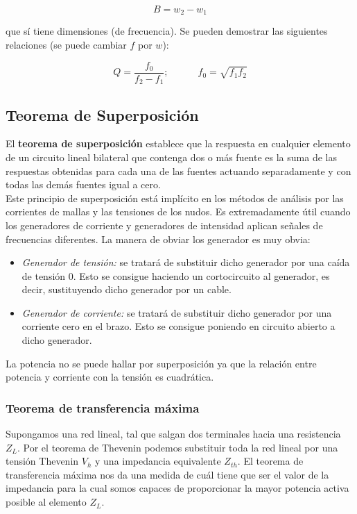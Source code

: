 \documentclass[12pt,a4paper]{article}
\newcommand{\tquad}{\quad \quad \quad}
\begin{document}
\begin{equation}
B = w_2 - w_1
\end{equation}

que sí tiene dimensiones (de frecuencia). Se pueden demostrar las siguientes relaciones (se puede cambiar $f$ por $w$):

\begin{equation}
Q = \dfrac{f_0}{f_2  - f_1}; \tquad f_0 = \sqrt{f_1 f_2}
\end{equation} 


\subsection{Teorema de Superposición}

El \textbf{teorema de superposición} establece que la respuesta en cualquier elemento de un circuito lineal bilateral que contenga dos o más fuente es la suma de las respuestas obtenidas para cada una de las fuentes actuando separadamente y con todas las demás fuentes igual a cero. \\

Este principio de superposición está implícito en los métodos de análisis por las corrientes de mallas y las tensiones de los nudos. Es extremadamente útil cuando los generadores de corriente y generadores de intensidad aplican señales de frecuencias diferentes. La manera de obviar los generador es muy obvia:

\begin{itemize}
\item \textit{Generador de tensión:} se tratará de substituir dicho generador por una caída de tensión 0. Esto se consigue haciendo un cortocircuito al generador, es decir, sustituyendo dicho generador por un cable.
\item \textit{Generador de corriente:} se tratará de substituir dicho generador por una corriente cero en el brazo. Esto se consigue poniendo en circuito abierto a dicho generador.
\end{itemize}

La potencia no se puede hallar por superposición ya que la relación entre potencia y corriente con la tensión es cuadrática.

\subsubsection{Teorema de transferencia máxima}

Supongamos una red lineal, tal que salgan dos terminales hacia una resistencia $Z_L$. Por el teorema de Thevenin podemos substituir toda la red lineal por una tensión Thevenin $V_h$ y una impedancia equivalente $Z_{th}$. El teorema de transferencia máxima nos da una medida de cuál tiene que ser el valor de la impedancia para la cual somos capaces de proporcionar la mayor potencia activa posible al elemento $Z_L$.  \\
\end{document}
